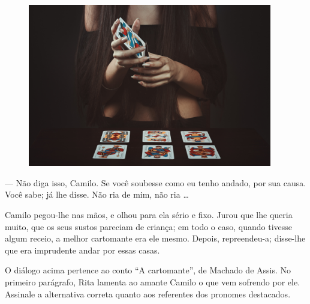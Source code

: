 
\begin{myquote}

\begin{figure}[H]
\centering
\includegraphics[width=0.95\textwidth]{./imgSAEB_7_POR/media/image63.png}
\end{figure}
--- Não diga isso, Camilo. Se você soubesse como eu tenho andado, por sua
causa. Você sabe; já lhe disse. Não ria de mim, não ria \ldots{}

Camilo pegou-lhe nas mãos, e olhou para ela sério e fixo. Jurou que lhe
queria muito, que os seus sustos pareciam de criança; em todo o caso,
quando tivesse algum receio, a melhor cartomante era ele mesmo. Depois,
repreendeu-a; disse-lhe que era imprudente andar por essas casas.

\end{myquote}


O diálogo acima pertence ao conto ``A cartomante'', de Machado de Assis.
No primeiro parágrafo, Rita lamenta ao amante Camilo o que vem 
sofrendo por ele. Assinale a alternativa correta quanto aos 
referentes dos pronomes destacados.  

